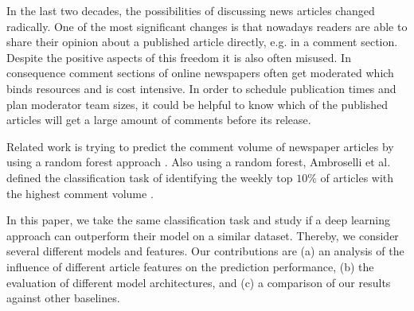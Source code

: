 In the last two decades, the possibilities of discussing news articles changed radically.
One of the most significant changes is that nowadays readers are able to share their opinion about a published article directly, e.g. in a comment section.
Despite the positive aspects of this freedom it is also often misused.
In consequence comment sections of online newspapers often get moderated which binds resources and is cost intensive.
In order to schedule publication times and plan moderator team sizes, it could be helpful to know which of the published articles will get a large amount of comments before its release.

Related work is trying to predict the comment volume of newspaper articles by using a random forest approach \cite{tsagkias2009predicting}.
Also using a random forest, Ambroselli et al. defined the classification task of identifying the weekly top $10\%$ of articles with the highest comment volume \cite{ambroselli2018prediction}.

In this paper, we take the same classification task and study if a deep learning approach can outperform their model on a similar dataset.
Thereby, we consider several different models and features.
Our contributions are (a) an analysis of the influence of different article features on the prediction performance, (b) the evaluation of different model architectures, and (c) a comparison of our results against other baselines.
